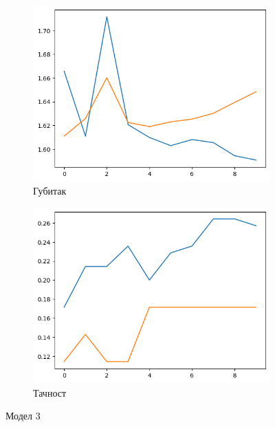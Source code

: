 \documentclass{article}
\begin{document}
\begin{figure}[htbp]
  \centering
  \begin{subfigure}{0.45\textwidth}
    \centering
    \includegraphics[width=\linewidth]{slike/3loss.png} %
    \caption{Губитак}
    \label{fig:slika5}
  \end{subfigure}
  \hfill
  \begin{subfigure}{0.45\textwidth}
    \centering
    \includegraphics[width=\linewidth]{slike/3acc.png} %
    \caption{Тачност}
    \label{fig:slika6}
  \end{subfigure}
  \caption{Модел 3}
  \label{fig:zajednicki_naslov}
\end{figure}
\end{document}
